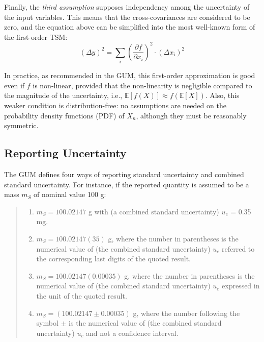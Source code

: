 \documentclass[twoside,nohyper]{tufte-book}
\providecommand{\tightlist}{%
  \setlength{\itemsep}{0pt}\setlength{\parskip}{0pt}}
\theoremstyle{definition}
\theoremstyle{definition}
\theoremstyle{definition}
\theoremstyle{remark}
\begin{document}
\pagebreak

Finally, the \emph{third assumption} supposes independency among the
uncertainty of the input variables. This means that the
cross-covariances are considered to be zero, and the equation above can
be simplified into the most well-known form of the first-order TSM:
%
\begin{equation}
  \left(\Delta y\right)^2 = \sum_i \left(\frac{\partial f}{\partial x_i}\right)^2\cdot \left(\Delta x_i\right)^2 \label{eq:TSM}
\end{equation}
%


In practice, as recommended in the GUM, this first-order approximation
is good even if \(f\) is non-linear, provided that the non-linearity is
negligible compared to the magnitude of the uncertainty, i.e.,
\(\mathbb{E}[f(X)]\approx f(\mathbb{E}[X])\). Also, this weaker
condition is distribution-free: no assumptions are needed on the
probability density functions (PDF) of \(X_n\), although they must be
reasonably symmetric.

\hypertarget{reporting-uncertainty}{%
\subsection{Reporting Uncertainty}\label{reporting-uncertainty}}

The GUM defines four ways of reporting standard uncertainty and combined
standard uncertainty. For instance, if the reported quantity is assumed
to be a mass \(m_S\) of nominal value 100 g:

\begin{quote}
\begin{enumerate}
\def\labelenumi{\arabic{enumi}.}
\tightlist
\item
  \(m_S = 100.02147\) g with (a combined standard uncertainty) \(u_c\) =
  0.35 mg.
\item
  \(m_S = 100.02147(35)\) g, where the number in parentheses is the
  numerical value of (the combined standard uncertainty) \(u_c\)
  referred to the corresponding last digits of the quoted result.
\item
  \(m_S = 100.02147(0.00035)\) g, where the number in parentheses is the
  numerical value of (the combined standard uncertainty) \(u_c\)
  expressed in the unit of the quoted result.
\item
  \(m_S = (100.02147 \pm 0.00035)\) g, where the number following the
  symbol \(\pm\) is the numerical value of (the combined standard
  uncertainty) \(u_c\) and not a confidence interval.
\end{enumerate}
\end{quote}
\end{document}
